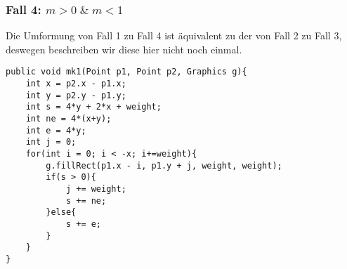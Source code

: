 \documentclass[a4paper,10pt]{article}
\begin{document}
\subsubsection{Fall 4: $m > 0 \;\&\; m < 1$}
Die Umformung von Fall 1 zu Fall 4 ist äquivalent zu der von Fall 2 zu Fall 3, deswegen beschreiben wir diese hier nicht noch einmal.
\begin{lstlisting}
public void mk1(Point p1, Point p2, Graphics g){
    int x = p2.x - p1.x;
    int y = p2.y - p1.y;
    int s = 4*y + 2*x + weight;
    int ne = 4*(x+y);
    int e = 4*y;
    int j = 0;
    for(int i = 0; i < -x; i+=weight){
        g.fillRect(p1.x - i, p1.y + j, weight, weight);
        if(s > 0){
            j += weight;
            s += ne;
        }else{
            s += e;
        }
    }
}
\end{lstlisting}
\end{document}
